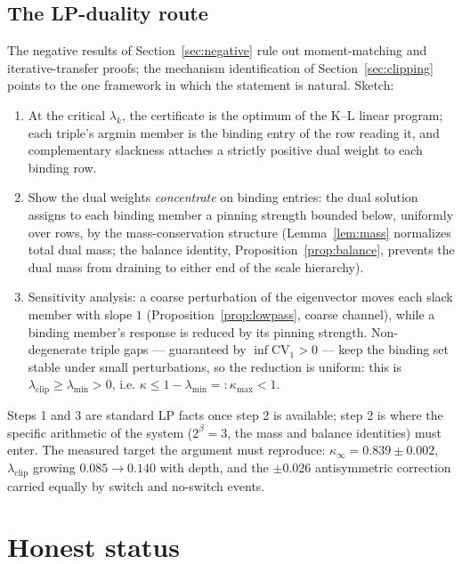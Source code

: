 \documentclass[11pt]{article}
\theoremstyle{definition}
\theoremstyle{remark}
\newcommand{\CV}{\mathrm{CV}}
\newcommand{\lam}{\lambda}
\newcommand{\bet}{\beta}
\newcommand{\kap}{\kappa}
\begin{document}
\subsection{The LP-duality route}

The negative results of Section~\ref{sec:negative} rule out
moment-matching and iterative-transfer proofs; the mechanism
identification of Section~\ref{sec:clipping} points to the one framework
in which the statement is natural. Sketch:

\begin{enumerate}
\item At the critical $\lam_k$, the certificate is the optimum of the
K--L linear program; each triple's argmin member is the binding entry of
the row reading it, and complementary slackness attaches a strictly
positive dual weight to each binding row.
\item Show the dual weights \emph{concentrate} on binding entries: the
dual solution assigns to each binding member a pinning strength bounded
below, uniformly over rows, by the mass-conservation structure
(Lemma~\ref{lem:mass} normalizes total dual mass; the balance identity,
Proposition~\ref{prop:balance}, prevents the dual mass from draining to
either end of the scale hierarchy).
\item Sensitivity analysis: a coarse perturbation of the eigenvector
moves each slack member with slope $1$ (Proposition~\ref{prop:lowpass},
coarse channel), while a binding member's response is reduced by its
pinning strength. Non-degenerate triple gaps --- guaranteed by
$\inf \CV_1 > 0$ --- keep the binding set stable under small
perturbations, so the reduction is uniform: this is
$\lam_{\mathrm{clip}} \geq \lam_{\min} > 0$, i.e.
$\kap \leq 1 - \lam_{\min} =: \kap_{\max} < 1$.
\end{enumerate}

Steps 1 and 3 are standard LP facts once step 2 is available; step 2 is
where the specific arithmetic of the system ($2^{\bet} = 3$, the mass and
balance identities) must enter. The measured target the argument must
reproduce: $\kap_\infty = 0.839 \pm 0.002$, $\lam_{\mathrm{clip}}$ growing
$0.085 \to 0.140$ with depth, and the $\pm 0.026$ antisymmetric
correction carried equally by switch and no-switch events.

\section{Honest status}
\label{sec:status}
\end{document}
